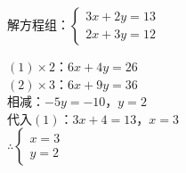 \documentclass[a4paper,12pt]{ctexart}
\begin{document}


\begin{example}
解方程组：$\begin{cases}3x+2y=13\\2x+3y=12\end{cases}$
\end{example}
\begin{solution}
$(1)\times2$：$6x+4y=26$\\
$(2)\times3$：$6x+9y=36$\\
相减：$-5y=-10$，$y=2$\\
代入$(1)$：$3x+4=13$，$x=3$\\
$\therefore\begin{cases}x=3\\y=2\end{cases}$
\end{solution}

\end{document}
